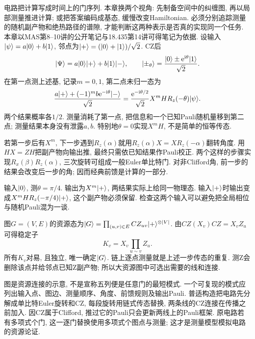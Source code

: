 电路把计算写成时间上的门序列. 本章换两个视角: 先制备空间中的纠缠图, 再以局部测量推进计算; 或把答案编码成基态, 缓慢改变Hamiltonian. 必须分别追踪测量的随机副产物和绝热路径的谱隙, 才能判断这两种表示是否真的实现同一个任务. 本章以MAS第8--10讲的公开笔记与18.435第14讲可得笔记为依据.
设输入$\lvert \psi\rangle=a\lvert 0\rangle+b\lvert 1\rangle$, 邻点为$\lvert +\rangle=(\lvert 0\rangle+\lvert 1\rangle)/\sqrt2$. CZ后
\[\lvert \Psi\rangle=a\lvert 0\rangle\lvert +\rangle +b\lvert 1\rangle\lvert -\rangle,\qquad
 \lvert \pm_\theta\rangle=\frac{\lvert 0\rangle\pm\mathrm e^{\mathrm i\theta}\lvert 1\rangle}{\sqrt2}.\]
在第一点测上述基, 记录$m=0,1$, 第二点未归一态为
\[\frac{a\lvert +\rangle +(-1)^m b\mathrm e^{-\mathrm i\theta}\lvert -\rangle}{\sqrt2}
 =\frac{\mathrm e^{-\mathrm i\theta/2}}{\sqrt2}X^mH R_z(-\theta)\lvert \psi\rangle.\]
两个结果概率各$1/2$. 测量消耗了第一点, 把信息和一个已知Pauli随机量移到第二点; 测量结果本身没有泄露$a,b$. 特别地$\theta=0$实现$X^mH$, 不是简单的恒等传态.

若第一步后有$X^m$, 下一步遇到$R_z(\alpha)$就用$R_z(\alpha)X=XR_z(-\alpha)$翻转角度. 用$HX=ZH$把副产物向输出推, 最终只需依已知结果作Pauli校正. 两个这样的步骤实现$R_x(\beta)R_z(\alpha)$, 三次旋转可组成一般Euler单比特门. 对非Clifford角, 前一步的结果会改变后一步的角; 因而经典前馈是计算的一部分.

\begin{example}输入$\lvert 0\rangle$, 测$\theta=\pi/4$. 输出为$X^m\lvert +\rangle$, 两结果实际上给同一物理态. 输入$\lvert +\rangle$时输出变成$X^mH R_z(-\pi/4)\lvert +\rangle$, 这个副产物必须保留. 检查这两个输入可以避免把全局相位与随机Pauli混为一谈.\end{example}

图$G=(V,E)$的资源态为$\lvert G\rangle=\prod_{(u,v)\in E}CZ_{uv}\lvert +\rangle^{\otimes |V|}$. 由$CZ(X_v)CZ=X_vZ_u$可得稳定子
\[K_v=X_v\prod_{u\sim v}Z_u.\]
所有$K_v$对易, 且独立, 唯一确定$\lvert G\rangle$. 链上逐点测量就是上述一步传态的重复. 测Z会删除该点并给邻点已知Z副产物; 所以大资源图中可选出需要的线和连接.

\begin{center}\end{center}
图是资源连接的示意, 不是宣称五列便是任意门的最短模式. 一个可复现的模式应列出输入点、图边、测量顺序、角度、前馈规则及输出Pauli. 普适构造把电路先分解成单比特Euler旋转和CZ, 每段旋转用链式传态替换, 两条线的CZ连接在传播之前加入. 因CZ属于Clifford, 推过它的Pauli只会更新两线上的Pauli框架. 原电路若有多项式个门, 这一逐门替换使用多项式个图点与测量; 这才是测量模型模拟电路的资源论证.


